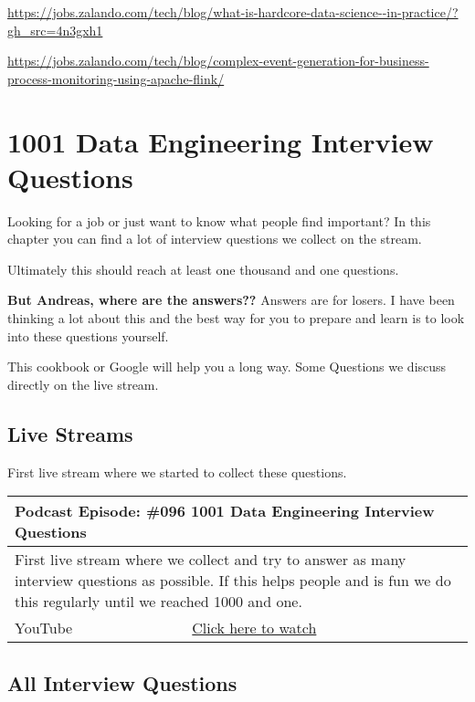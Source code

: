\documentclass[12pt, numbers=noenddot]{scrreprt} %
\begin{document}
\url{https://jobs.zalando.com/tech/blog/what-is-hardcore-data-science--in-practice/?gh_src=4n3gxh1}

\url{https://jobs.zalando.com/tech/blog/complex-event-generation-for-business-process-monitoring-using-apache-flink/}



\part{1001 Data Engineering Interview Questions}

Looking for a job or just want to know what people find important?
In this chapter you can find a lot of interview questions we collect on the stream. 

Ultimately this should reach at least one thousand and one questions.

\textbf{But Andreas, where are the answers??}
Answers are for losers. I have been thinking a lot about this and the best way for you to prepare and learn is to look into these questions yourself.

This cookbook or Google will help you a long way. Some Questions we discuss directly on the live stream.

\chapter{Live Streams}

First live stream where we started to collect these questions. 

\begin{table}[h]
\begin{tabular}{ll}
\hline
\multicolumn{2}{l}{\textbf{Podcast Episode:} \#096 1001 Data Engineering Interview Questions} \\ \hline
\multicolumn{2}{p{15cm}}{First live stream where we collect and try to answer as many interview questions as possible. If this helps people and is fun we do this regularly until we reached 1000 and one.}         \\ \hline
\multicolumn{1}{l|}{YouTube}   & \href{https://youtu.be/WbqRH2r3N40}{Click here to watch}   \\  \hline
\end{tabular}
\end{table}


\chapter{All Interview Questions}
\end{document}

